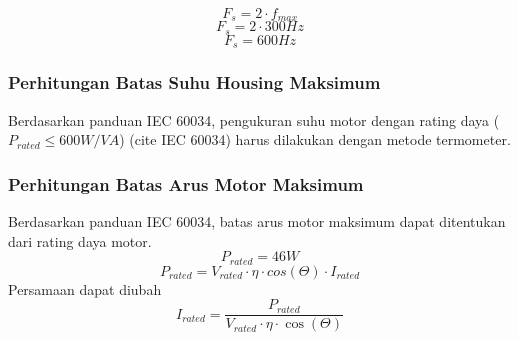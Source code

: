 \documentclass{elsinta}
\begin{document}
    \[F_{s} = 2 \cdot f_{max}\]
    \[F_{s} = 2 \cdot 300 Hz\]
    \[F_{s} = 600 Hz\]

\subsubsection{Perhitungan Batas Suhu Housing Maksimum}
    Berdasarkan panduan IEC 60034, pengukuran suhu motor dengan
    rating daya ($P_{rated} \leq 600W/VA$) (cite IEC 60034)
    harus dilakukan dengan metode termometer. 


\subsubsection{Perhitungan Batas Arus Motor Maksimum}
    Berdasarkan panduan IEC 60034, batas arus motor maksimum
    dapat ditentukan dari rating daya motor.
    \[P_{rated}=46W\] 
    \[P_{rated}=V_{rated} \cdot \eta \cdot cos(\Theta) \cdot I_{rated}\] 
    Persamaan dapat diubah
    \[I_{rated}=\frac{P_{rated}}{V_{rated} \cdot \eta \cdot \cos(\Theta)}\]


\subsection{\HardwareSpecTitle}

\end{document}
